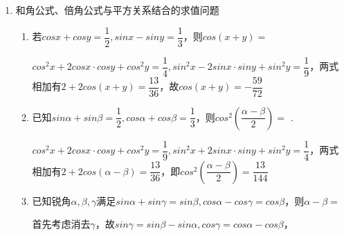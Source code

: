 \begin{enumerate}
\begin{enumerate}
    \item 已知$sin\alpha = \dfrac{2\sqrt{6}}{7}$，$cos(\alpha - \beta) = \dfrac{\sqrt{10}}{5}$，且$0 < \alpha < \dfrac{3\pi}{4}, 0 < \beta < \dfrac{3\pi}{4}$，则$sin\beta = $
    \begin{jieda}
        $sin\alpha = \dfrac{2\sqrt{6}}{7} < \dfrac{\sqrt{2}}{2}$，又因为$\alpha \in (0, \dfrac{3\pi}{4})$，故$\alpha \in (0, \dfrac{\pi}{4})$，$cos\alpha = \dfrac{5}{7}$ \\
        $cos(\alpha - \beta) = \dfrac{\sqrt{10}}{5}$，故$sin(\alpha - \beta) = \pm \dfrac{\sqrt{15}}{5}$，因为$\dfrac{\sqrt{15}}{5} > \dfrac{2\sqrt{6}}{7}$且$\beta \in (0, \dfrac{3\pi}{4})$，因此$sin(\alpha - \beta) = -\dfrac{\sqrt{15}}{5}$ \\
        故$sin\beta = -sin(-\beta) = -sin(\alpha-\beta - \alpha) = -(-\dfrac{\sqrt{15}}{5} \times \dfrac{5}{7} - \dfrac{\sqrt{10}}{5} \times \dfrac{2\sqrt{6}}{7}) = \dfrac{9\sqrt{15}}{35}$
    \end{jieda}
    \end{enumerate}
    \item 和角公式、倍角公式与平方关系结合的求值问题
    \begin{enumerate}
        \item 若$cosx+cosy = \dfrac{1}{2}, sinx - siny = \dfrac{1}{3}$，则$cos(x+y) = $
        \begin{jieda}
            $cos^2x+2cosx \cdot cosy + cos^2y = \dfrac{1}{4}, sin^2x - 2sinx \cdot siny + sin^2y = \dfrac{1}{9}$，两式相加有$2 + 2cos(x+y) = \dfrac{13}{36}$，故$cos(x+y) = -\dfrac{59}{72}$
        \end{jieda}
        \item 已知$sin\alpha + sin\beta = \dfrac{1}{2}, cos\alpha + cos\beta = \dfrac{1}{3}$，则$cos^2(\dfrac{\alpha-\beta}{2})=$ .
        \begin{jieda}
            $cos^2x + 2cosx \cdot cosy + cos^2y = \dfrac{1}{9}, sin^2x + 2sinx \cdot siny + sin^2y = \dfrac{1}{4}$，两式相加有$2 + 2cos(\alpha - \beta) = \dfrac{13}{36}$，即$cos^2(\dfrac{\alpha - \beta}{2}) = \dfrac{13}{144}$
        \end{jieda}
        \item 已知锐角$\alpha, \beta, \gamma$满足$sin\alpha + sin \gamma = sin\beta, cos\alpha - cos\gamma = cos\beta$，则$\alpha - \beta = $
        \begin{jieda}
            首先考虑消去$\gamma$，故$sin\gamma = sin\beta - sin\alpha, cos\gamma = cos\alpha - cos\beta$，\\

\end{jieda}
\end{enumerate}
\end{enumerate}
